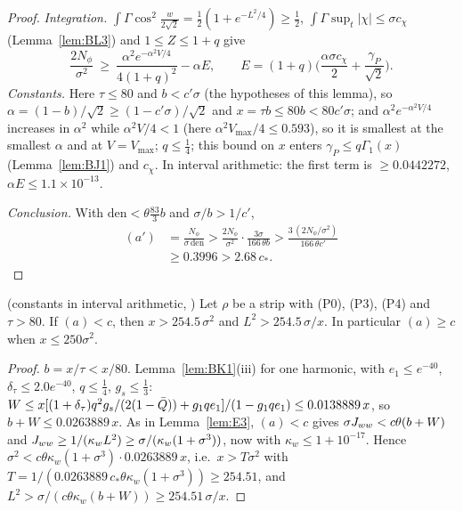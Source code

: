 \begin{proof}
\emph{Integration.} $\int\Gamma\cos^2\frac w{2\sqrt2}=\frac12(1+e^{-L^2/4})\ge\frac12$, $\int\Gamma\sup_t|\chi|\le\sigma c_\chi$ (Lemma~\ref{lem:BL3}) and $1\le Z\le1+q$ give
\begin{equation*}
\frac{2N_\phi}{\sigma^2}\ \ge\ \frac{\alpha^2e^{-\alpha^2V/4}}{4(1+q)^2}-\alpha E,\qquad E=(1+q)\Big(\frac{\alpha\sigma c_\chi}2+\frac{\gamma_P}{\sqrt2}\Big).
\end{equation*}
\emph{Constants.} Here $\tau\le80$ and $b<c'\sigma$ (the hypotheses of this lemma), so $\alpha=(1-b)/\sqrt2\ge(1-c'\sigma)/\sqrt2$ and $x=\tau b\le80b<80c'\sigma$; and $\alpha^2e^{-\alpha^2V/4}$ increases in $\alpha^2$ while $\alpha^2V/4<1$ (here $\alpha^2V_{\max}/4\le0.593$), so it is smallest at the
smallest $\alpha$ and at $V=V_{\max}$; $q\le\frac14$; this bound on $x$ enters $\gamma_P\le q\Gamma_1(x)$ (Lemma~\ref{lem:BJ1}) and $c_\chi$. In interval
arithmetic: the first term is $\ge0.0442272$, $\alpha E\le1.1\times10^{-13}$.

\emph{Conclusion.} With $\mathrm{den}<\theta\frac{83}3b$ and $\sigma/b>1/c'$,
\begin{equation*}
\begin{aligned}(a')&=\frac{N_\phi}{\sigma\,\mathrm{den}}>\frac{2N_\phi}{\sigma^2}\cdot\frac{3\sigma}{166\,\theta b}>\frac{3\,(2N_\phi/\sigma^2)}{166\,\theta c'}\\&\ge0.3996>2.68\,c_* .\end{aligned}
\end{equation*}
\end{proof}

\begin{lemma} \proofst{} (constants in interval arithmetic, )
\label{lem:E4}
Let $\rho$ be a strip with (P0), (P3), (P4) and $\tau>80$. If $(a)<c$, then $x>254.5\,\sigma^2$ and $L^2>254.5\,\sigma/x$. In particular $(a)\ge c$ when
$x\le250\sigma^2$.
\end{lemma}
\begin{proof}
$b=x/\tau<x/80$. Lemma~\ref{lem:BK1}(iii) for one harmonic, with $e_1\le e^{-40}$, $\delta_\tau\le2.0e^{-40}$, $q\le\frac14$, $g_s\le\frac13$:
$W\le x[(1+\delta_\tau)q^2g_s/(2(1-\bar Q))+g_1qe_1]/(1-g_1qe_1)\le0.0138889\,x$, so $b+W\le0.0263889\,x$. As in Lemma~\ref{lem:E3}, $(a)<c$ gives
$\sigma J_{ww}<c\theta(b+W)$ and $J_{ww}\ge1/(\kappa_wL^2)\ge\sigma/(\kappa_w(1+\sigma^3))$, now with $\kappa_w\le1+10^{-17}$. Hence
$\sigma^2<c\theta\kappa_w(1+\sigma^3)\cdot0.0263889\,x$, i.e.\ $x>T\sigma^2$ with $T=1/(0.0263889\,c_*\theta\kappa_w(1+\sigma^3))\ge254.51$, and
$L^2>\sigma/(c\theta\kappa_w(b+W))\ge254.51\,\sigma/x$.
\end{proof}

